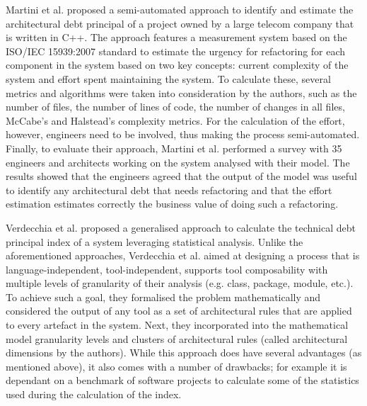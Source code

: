 Martini et al. \cite{Martini2018b} proposed a semi-automated approach to identify and estimate the architectural debt principal of a project owned by a large telecom company that is written in C++.
The approach features a measurement system based on the ISO/IEC 15939:2007 standard to estimate the urgency for refactoring for each component in the system based on two key concepts: current complexity of the system and effort spent maintaining the system.
To calculate these, several metrics and algorithms were taken into consideration by the authors, such as the number of files, the number of lines of code, the number of changes in all files, McCabe's and Halstead's complexity metrics.
For the calculation of the effort, however, engineers need to be involved, thus making the process semi-automated.
Finally, to evaluate their approach, Martini et al. performed a survey with 35 engineers and architects working on the system analysed with their model.
The results showed that the engineers agreed that the output of the model was useful to identify any architectural debt that needs refactoring and that the effort estimation estimates correctly the business value of doing such a refactoring.

Verdecchia et al. \cite{Verdecchia2020} proposed a generalised approach to calculate  the technical debt principal index of a system leveraging statistical analysis.
Unlike the aforementioned approaches, Verdecchia et al. aimed at designing a process that is language-independent, tool-independent, supports tool composability with multiple levels of granularity of their analysis (e.g. class, package, module, etc.).
To achieve such a goal, they formalised the problem mathematically and considered the output of any tool as a set of architectural rules that are applied to every artefact in the system. 
Next, they incorporated into the mathematical model granularity levels and clusters of architectural rules (called architectural dimensions by the authors).
While this approach does have several advantages (as mentioned above), it also comes with a number of drawbacks; for example it is dependant on a benchmark of software projects to calculate some of the statistics used during the calculation of the index.


